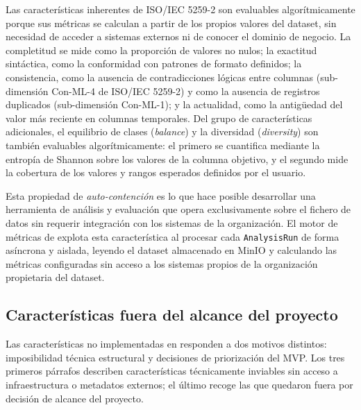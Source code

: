 Las características inherentes de \ac{ISO}/IEC 5259-2 son evaluables
algorítmicamente porque sus métricas se calculan a partir de los propios
valores del dataset, sin necesidad de acceder a sistemas externos ni de conocer
el dominio de negocio. La completitud se mide como la proporción de valores no
nulos; la exactitud sintáctica, como la conformidad con patrones de formato
definidos; la consistencia, como la ausencia de contradicciones lógicas entre columnas
(sub-dimensión Con-ML-4 de \ac{ISO}/IEC 5259-2) y como la ausencia de registros
duplicados (sub-dimensión Con-ML-1); y la actualidad, como la antigüedad del valor
más reciente en columnas temporales. Del grupo de características adicionales,
el equilibrio de clases (\emph{balance}) y la diversidad (\emph{diversity})
son también evaluables algorítmicamente: el primero se cuantifica mediante la
entropía de Shannon sobre los valores de la columna objetivo, y el segundo mide
la cobertura de los valores y rangos esperados definidos por el usuario.

Esta propiedad de \emph{auto-contención} es lo que hace posible desarrollar
una herramienta de análisis y evaluación que opera exclusivamente sobre el
fichero de datos sin requerir integración con los sistemas de la organización. El motor de
métricas de \dataqual explota esta característica al procesar cada
\texttt{AnalysisRun} de forma asíncrona y aislada, leyendo el dataset
almacenado en MinIO y calculando las métricas configuradas sin acceso a los sistemas propios de
la organización propietaria del dataset.

\subsection{Características fuera del alcance del proyecto}
\label{sec:caracteristicas-fuera-alcance}

Las características no implementadas en \dataqual responden a dos motivos
distintos: imposibilidad técnica estructural y decisiones de priorización
del \ac{MVP}. Los tres primeros párrafos describen características técnicamente
inviables sin acceso a infraestructura o metadatos externos; el último recoge
las que quedaron fuera por decisión de alcance del proyecto.


